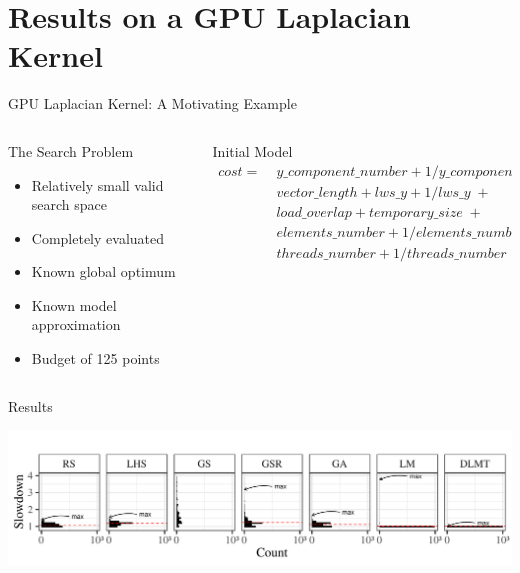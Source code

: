 \documentclass[10pt, compress, aspectratio=169, xcolor={table,usenames,dvipsnames}]{beamer}
\begin{document}
\section{Results on a GPU Laplacian Kernel}
\label{sec:org720215b}
\begin{frame}[label={sec:orge980c02}]{GPU Laplacian Kernel: A Motivating Example}
\begin{columns}
\begin{column}{0.5\columnwidth}
\begin{block}{The Search Problem}
\begin{itemize}
\item Relatively \alert{small valid search space}
\item \alert{Completely evaluated}
\item Known \alert{global optimum}
\item Known \alert{model approximation}
\item \alert{Budget} of \alert{125 points}
\end{itemize}
\end{block}
\end{column}

\begin{column}{0.5\columnwidth}
\begin{block}{Initial Model}
\footnotesize
\begin{align*}
cost = & \; y\_component\_number + 1 / y\_component\_number \; + \\
& \; vector\_length + lws\_y + 1 / lws\_y \; + \\
& \; load\_overlap + temporary\_size \; + \\
& \; elements\_number + 1 / elements\_number \; + \\
& \; threads\_number + 1 / threads\_number
\end{align*}
\normalsize
\end{block}
\end{column}
\end{columns}

\begin{block}{Results}
\vspace{-.3cm}

\begin{center}
\begin{center}
\includegraphics[width=.88\columnwidth]{../../../img/comparison_histogram.pdf}
\end{center}
\end{center}
\end{block}
\end{frame}
\end{document}
